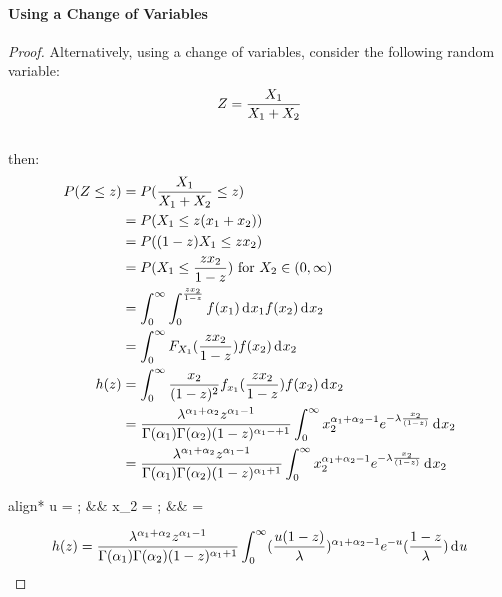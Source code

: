 \documentclass[12pt]{article}
\begin{document}
\paragraph{Using a Change of Variables}
\begin{proof}
	Alternatively, using a change of variables, consider the following random variable:\vspace*{-12pt}
	\begin{equation}
		Z = \frac{X_1}{X_1+X_2}\\
	\end{equation}\\[-38pt]
	then:\vspace*{-12pt}
	\begin{equation}
		\begin{split}
			P(Z\le z)	&=	P(\frac{X_1}{X_1+X_2}\le z)\\
						&=	P(X_1\le z (x_1+ x_2))\\
						&=	P((1-z)X_1\le zx_2)\\
						&=	P(X_1\le {\frac{zx_2}{1-z}}) \text{ for } X_2 \in (0,\infty)\\
						&=	\int_{0}^{\infty}\int_{0}^{\frac{zx_2}{1-z}} f(x_1)\mathop{}\!\mathrm{d^{}}x_1 f(x_2)\mathop{}\!\mathrm{d^{}}x_2\\
						&=	\int_{0}^{\infty}F_{X_1}(\frac{z x_2}{1-z})f(x_2)\mathop{}\!\mathrm{d^{}}x_2\\
			h(z)		&=	\int_{0}^{\infty}\frac{x_2}{(1-z)^2}f_{x_1}(\frac{zx_2}{1-z})f(x_2)\mathop{}\!\mathrm{d^{}}x_2\\
						&=	\frac{\lambda^{\alpha_1+\alpha_2} z^{\alpha_1 - 1}}{\Gamma (\alpha _1) \Gamma (\alpha _2) (1-z)^{\alpha_1 -+1}} \int_{0}^{\infty} x_2^{\alpha_1 + \alpha_2 - 1} e^{-\lambda \frac{x_2}{(1-z)}}\mathop{}\!\mathrm{d^{}}x_2\\
						&=	\frac{\lambda^{\alpha_1+\alpha_2} z^{\alpha_1 - 1}}{\Gamma (\alpha _1) \Gamma (\alpha _2) (1-z)^{\alpha_1 +1}} \int_{0}^{\infty} x_2^{\alpha_1 + \alpha_2 - 1} e^{-\lambda \frac{x_2}{(1-z)}}\mathop{}\!\mathrm{d^{}}x_2\\
		\end{split}
	\end{equation}
	\begin{empheq}[box=\widefbox]{align*}
		u = ;	&&	x_2 = ;	&&	 = 
	\end{empheq}
	\begin{equation}
		\begin{split}
			h(z)	&=	\frac{\lambda^{\alpha_1+\alpha_2} z^{\alpha_1 - 1}}{\Gamma (\alpha _1) \Gamma (\alpha _2) (1-z)^{\alpha_1 +1}} \int_{0}^{\infty}  (\frac{u (1-z)}{\lambda})^{\alpha_1 + \alpha_2 -1} e^{-u} (\frac{1-z}{\lambda})\diff{u}\\

\end{split}
\end{equation}
\end{proof}
\end{document}
